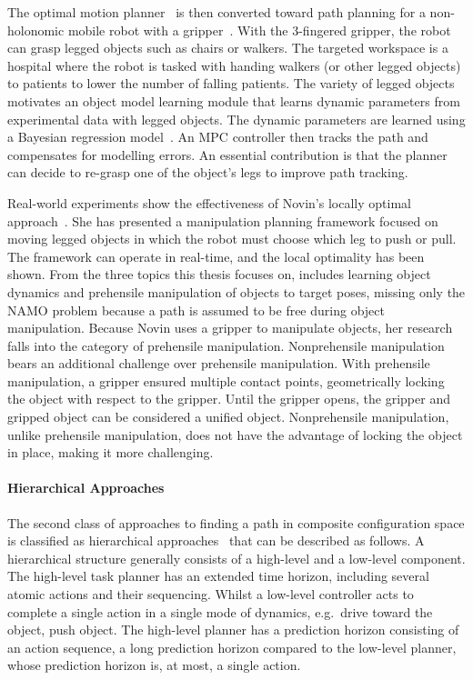 The optimal motion planner~\cite{sabbaghnovin_optimal_2016} is then converted toward path planning for a non-holonomic mobile robot with a gripper~\cite{novin_dynamic_2018}. With the 3-fingered gripper, the robot can grasp legged objects such as chairs or walkers. The targeted workspace is a hospital where the robot is tasked with handing walkers (or other legged objects) to patients to lower the number of falling patients. The variety of legged objects motivates an object model learning module that learns dynamic parameters from experimental data with legged objects. The dynamic parameters are learned using a Bayesian regression model~\cite{scholz_navigation_2016}. An \ac{MPC} controller then tracks the path and compensates for modelling errors. An essential contribution is that the planner can decide to re-grasp one of the object's legs to improve path tracking.\bs

Real-world experiments show the effectiveness of Novin's locally optimal approach~\cite{sabbaghnovin_model_2021}. She has presented a manipulation planning framework focused on moving legged objects in which the robot must choose which leg to push or pull. The framework can operate in real-time, and the local optimality has been shown. From the three topics this thesis focuses on, \citeauthor{sabbaghnovin_model_2021} includes learning object dynamics and prehensile manipulation of objects to target poses, missing only the \ac{NAMO} problem because a path is assumed to be free during object manipulation. Because Novin uses a gripper to manipulate objects, her research falls into the category of prehensile manipulation. Nonprehensile manipulation bears an additional challenge over prehensile manipulation. With prehensile manipulation, a gripper ensured multiple contact points, geometrically locking the object with respect to the gripper. Until the gripper opens, the gripper and gripped object can be considered a unified object. Nonprehensile manipulation, unlike prehensile manipulation, does not have the advantage of locking the object in place, making it more challenging.\bs

\paragraph{Hierarchical Approaches}
The second class of approaches to finding a path in composite configuration space is classified as hierarchical approaches~\cite{ellis_navigation_2022,krontiris_dealing_2015,scholz_navigation_2016,vega-brown_asymptotically_2020,wang_affordancebased_2020} that can be described as follows. A hierarchical structure generally consists of a high-level and a low-level component. The high-level task planner has an extended time horizon, including several atomic actions and their sequencing. Whilst a low-level controller acts to complete a single action in a single mode of dynamics, e.g.~drive toward the object, push object. The high-level planner has a prediction horizon consisting of an action sequence, a long prediction horizon compared to the low-level planner, whose prediction horizon is, at most, a single action.\bs

